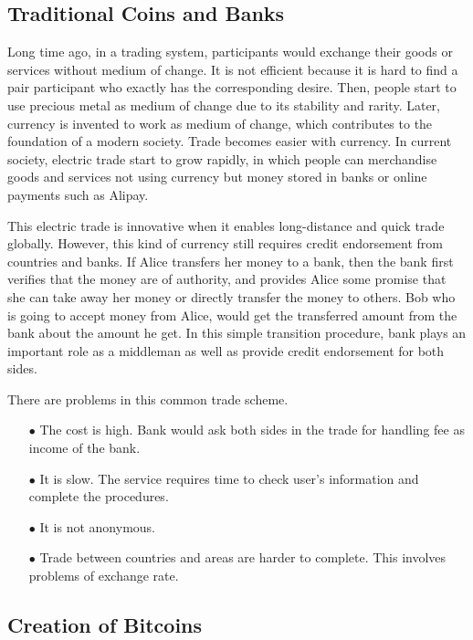 \documentclass[12pt,a4paper]{article}
\begin{document}
\subsection{Traditional Coins and Banks}

Long time ago, in a trading system, participants would exchange their goods or services without medium of change. It is not efficient because it is hard to find a pair participant who exactly has the corresponding desire. Then, people start to use precious metal as medium of change due to its stability and rarity. Later, currency is invented to work as medium of change, which contributes to the foundation of a modern society. Trade becomes easier with currency. In current society, electric trade start to grow rapidly, in which people can merchandise goods and services not using currency but money stored in banks or online payments such as Alipay. 

This electric trade is innovative when it enables long-distance and quick trade globally. However, this kind of currency still requires credit endorsement from countries and banks. If Alice transfers her money to a bank, then the bank first verifies that the money are of authority, and provides Alice some promise that she can take away her money or directly transfer the money to others. Bob who is going to accept money from Alice, would get the transferred amount from the bank about the amount he get. In this simple transition procedure, bank plays an important role as a middleman as well as provide credit endorsement for both sides.

There are problems in this common trade scheme.
\begin{enumerate}
    \item [$\bullet$] The cost is high. Bank would ask both sides in the trade for handling fee as income of the bank.
    \item [$\bullet$] It is slow. The service requires time to check user's information and complete the procedures.
    \item [$\bullet$] It is not anonymous. 
    \item [$\bullet$]  Trade between countries and areas are harder to complete. This involves problems of exchange rate.
\end{enumerate}

\subsection{Creation of Bitcoins}
\end{document}
